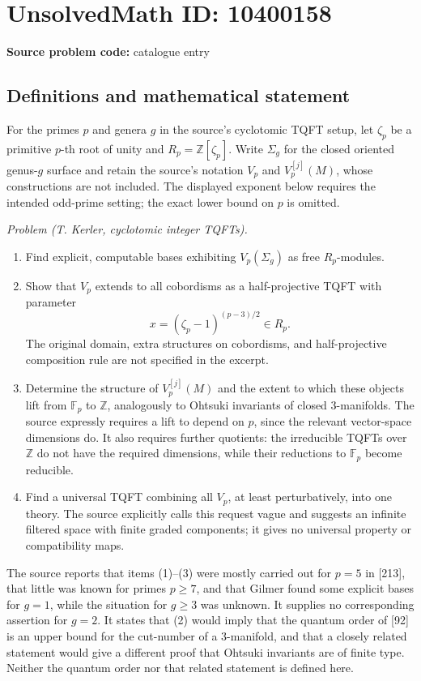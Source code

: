 \documentclass[11pt]{article}
\newcommand{\Z}{\mathbb{Z}}
\newcommand{\F}{\mathbb{F}}
\begin{document}
\section*{UnsolvedMath ID: 10400158}
\textbf{Source problem code:} catalogue entry
\subsection{Definitions and mathematical statement}
For the primes \(p\) and genera \(g\) in the source's cyclotomic TQFT setup, let \(\zeta_p\) be a primitive \(p\)-th root of unity and \(R_p=\Z[\zeta_p]\). Write \(\Sigma_g\) for the closed oriented genus-\(g\) surface and retain the source's notation \(V_p\) and \(V_p^{[j]}(M)\), whose constructions are not included. The displayed exponent below requires the intended odd-prime setting; the exact lower bound on \(p\) is omitted.

\emph{Problem (T. Kerler, cyclotomic integer TQFTs).}
\begin{enumerate}
\item Find explicit, computable bases exhibiting \(V_p(\Sigma_g)\) as free \(R_p\)-modules.
\item Show that \(V_p\) extends to all cobordisms as a half-projective TQFT with parameter
\[
 x=(\zeta_p-1)^{(p-3)/2}\in R_p.
\]
The original domain, extra structures on cobordisms, and half-projective composition rule are not specified in the excerpt.
\item Determine the structure of \(V_p^{[j]}(M)\) and the extent to which these objects lift from \(\F_p\) to \(\Z\), analogously to Ohtsuki invariants of closed \(3\)-manifolds. The source expressly requires a lift to depend on \(p\), since the relevant vector-space dimensions do. It also requires further quotients: the irreducible TQFTs over \(\Z\) do not have the required dimensions, while their reductions to \(\F_p\) become reducible.
\item Find a universal TQFT combining all \(V_p\), at least perturbatively, into one theory. The source explicitly calls this request vague and suggests an infinite filtered space with finite graded components; it gives no universal property or compatibility maps.
\end{enumerate}
The source reports that items (1)--(3) were mostly carried out for \(p=5\) in [213], that little was known for primes \(p\geq7\), and that Gilmer found some explicit bases for \(g=1\), while the situation for \(g\geq3\) was unknown. It supplies no corresponding assertion for \(g=2\). It states that (2) would imply that the quantum order of [92] is an upper bound for the cut-number of a \(3\)-manifold, and that a closely related statement would give a different proof that Ohtsuki invariants are of finite type. Neither the quantum order nor that related statement is defined here.
\end{document}
